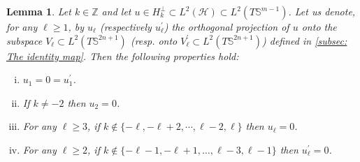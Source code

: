 \documentclass{article}
\numberwithin{equation}{section}        %
\theoremstyle{bfnote}
\newtheorem{lem}[thm]{Lemma}                %
\theoremstyle{definition}
\theoremstyle{bfremark}
\newcommand{\Z}{\mathbb{Z}}                 %
\newcommand{\Sp}{\mathbb{S}}                %
\begin{document}
\begin{lem}     \label{lem: projections}
    Let $k \in \Z$ and let $u \in H^\perp_k \subset L^2(\mathscr{H}) \subset L^2(T\Sp^{m-1})$. Let us denote, for any $\ell \geq 1$, by $u_\ell$ (respectively $u^\prime_\ell$) the orthogonal projection of $u$ onto the subspace $V_\ell \subset L^2(T\Sp^{2n+1})$ (resp. onto $V^\prime_\ell \subset L^2(T\Sp^{2n+1})$) defined in \cref{subsec: The identity map}. Then the following properties hold:
    \begin{enumerate}[(i)]
        \item $u_1 = 0 = u^\prime_1$.
        \item If $k \neq -2$ then $u_2 = 0$.
        \item For any $\ell \geq 3$, if $k \notin \{-\ell, -\ell+2, \cdots, \ell-2,\ell\}$ then $u_\ell = 0$.
        \item For any $\ell \geq 2$, if $k \notin \{-\ell-1,-\ell+1, \ldots, \ell-3,\ell-1\}$ then $u^\prime_\ell = 0$.
    \end{enumerate}
\end{lem}
\end{document}
